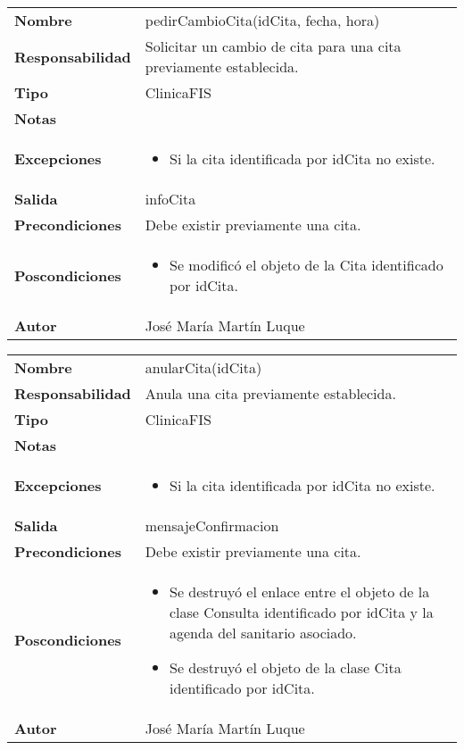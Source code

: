 \documentclass[11pt,a4paper]{article}
\newenvironment{itemizenomargins}
    {\begin{minipage}[t]{1\linewidth}\begin{itemize}}
    {\end{itemize}\end{minipage}}
\begin{document}
\begin{table}[H]
	\centering
	\label{pedir-cambio-cita}
	\begin{tabularx}{\textwidth}{l|X}
    \textbf{Nombre}          & pedirCambioCita(idCita, fecha, hora)\\
		\textbf{Responsabilidad} & Solicitar un cambio de cita para una cita previamente establecida. \\
		\textbf{Tipo}            & ClinicaFIS \\
		\textbf{Notas}           &  \\
		\textbf{Excepciones}     & 
		\begin{itemizenomargins}
			\item Si la cita identificada por idCita no existe.
		\end{itemizenomargins} \\
		\textbf{Salida}          &  infoCita\\
		\textbf{Precondiciones}  &  Debe existir previamente una cita.\\
		\textbf{Poscondiciones}  & 
		\begin{itemizenomargins}
			\item Se modificó el objeto de la Cita identificado por idCita.
		\end{itemizenomargins} \\
		\textbf{Autor}			 & José María Martín Luque
	\end{tabularx}
\end{table}

\begin{table}[H]
	\centering
	\label{anular-cita}
	\begin{tabularx}{\textwidth}{l|X}
    \textbf{Nombre}          & anularCita(idCita)\\
		\textbf{Responsabilidad} & Anula una cita previamente establecida. \\
		\textbf{Tipo}            & ClinicaFIS \\
		\textbf{Notas}           &  \\
		\textbf{Excepciones}     & 
		\begin{itemizenomargins}
			\item Si la cita identificada por idCita no existe.
		\end{itemizenomargins} \\
		\textbf{Salida}          &  mensajeConfirmacion\\
		\textbf{Precondiciones}  &  Debe existir previamente una cita.\\
		\textbf{Poscondiciones}  & 
		\begin{itemizenomargins}
			\item Se destruyó el enlace entre el objeto de la clase Consulta identificado por idCita y la agenda del sanitario asociado.
			\item Se destruyó el objeto de la clase Cita identificado por idCita.
		\end{itemizenomargins} \\
		\textbf{Autor}			 & José María Martín Luque
	\end{tabularx}
\end{table}
\end{document}

